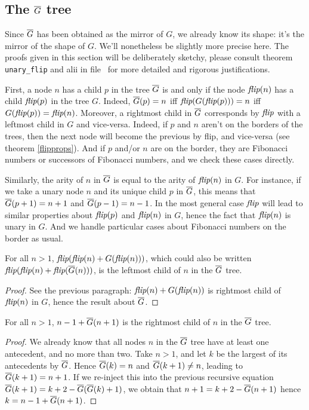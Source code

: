\documentclass[a4paper,11pt]{article}
\begin{document}
\subsection{The $\overline{G}$ tree}

Since $\overline{G}$ has been obtained as the mirror of $G$, we already
know its shape: it's the mirror of the shape of $G$. We'll
nonetheless be slightly more precise here. The proofs given
in this section will be deliberately sketchy, please consult
theorem {\tt unary\_flip} and alii in file \ for
more detailed and rigorous justifications.

First, a node
$n$ has a child $p$ in the tree $\overline{G}$ is and only if the
node $\textit{flip}(n)$ has a child $\textit{flip}(p)$ in the tree $G$.
Indeed, $\overline{G}(p)=n$ iff $\textit{flip}(G(\textit{flip}(p)))=n$ iff
$G(\textit{flip}(p))=\textit{flip}(n)$. Moreover, a rightmost child in $\overline{G}$
corresponds by $\textit{flip}$ with a leftmost child in $G$ and vice-versa.
Indeed, if $p$ and $n$ aren't on the borders of the trees,
then the next node will become the previous by flip, and vice-versa
(see theorem \ref{flipprops}). And if $p$ and/or $n$ are on the
border, they are Fibonacci numbers or successors of Fibonacci
numbers, and we check these cases directly.

Similarly, the arity of $n$ in $\overline{G}$ is equal to the arity of
$\textit{flip}(n)$ in $G$.
For instance, if we take a unary node $n$ and its unique
child $p$ in $\overline{G}$, this means that $\overline{G}(p+1)=n+1$ and
$\overline{G}(p-1)=n-1$. In the most general case $\textit{flip}$ will lead
to similar properties about $\textit{flip}(p)$ and $\textit{flip}(n)$ in $G$,
hence the fact that $\textit{flip}(n)$ is unary in $G$. And we handle
particular cases about Fibonacci numbers on the border as usual.

\begin{theorem}
For all $n>1$, $\textit{flip}(\textit{flip}(n)+G(\textit{flip}(n)))$, which could also be
written $\textit{flip}(\textit{flip}(n)+\textit{flip}(\overline{G}(n)))$, is the leftmost child
of $n$ in the $\overline{G}$ tree. 
\end{theorem}
\begin{proof}
See the previous paragraph: $\textit{flip}(n)+G(\textit{flip}(n))$ is rightmost
child of $\textit{flip}(n)$ in $G$, hence the result about $\overline{G}$.
\end{proof}

\begin{theorem}
For all $n>1$, $n-1+\overline{G}(n+1)$ is the rightmost child of $n$ in the
$\overline{G}$ tree.
\end{theorem}
\begin{proof}
We already know that all nodes $n$ in the $\overline{G}$ tree have at
least one antecedent, and no more than two.
Take $n>1$, and let $k$ be the largest of its antecedents by $\overline{G}$.
Hence $\overline{G}(k)=n$ and $\overline{G}(k+1)\neq n$, leading to $\overline{G}(k+1)=n+1$.
If we re-inject this into the previous recursive equation
$\overline{G}(k+1) = k+2 - \overline{G}(\overline{G}(k)+1)$,
we obtain that $n+1 = k+2-\overline{G}(n+1)$ hence $k=n-1+\overline{G}(n+1)$.
\end{proof}
\end{document}
